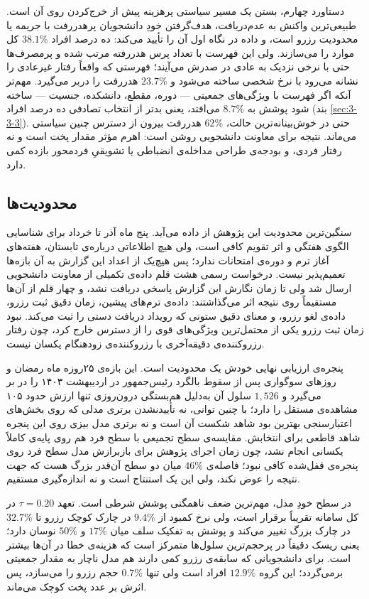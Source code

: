 دستاورد چهارم، بستن یک مسیر سیاستی پرهزینه پیش از خرج‌کردن روی آن است. طبیعی‌ترین
واکنش به عدم‌دریافت، هدف‌گرفتن خودِ دانشجویان پرهدررفت با جریمه یا محدودیت رزرو است، و
داده در نگاه اول آن را تأیید می‌کند: ده درصد افراد $38.1\%$ کل موارد را می‌سازند. ولی
این فهرست با تعداد پرس هدررفته مرتب شده و پرمصرف‌ها حتی با نرخی نزدیک به عادی در صدرش
می‌آیند؛ فهرستی که واقعاً رفتار غیرعادی را نشانه می‌رود با نرخ شخصی ساخته می‌شود و
$23.7\%$ هدررفت را دربر می‌گیرد. مهم‌تر آنکه اگر فهرست با ویژگی‌های جمعیتی — دوره، مقطع،
دانشکده، جنسیت — ساخته شود پوشش به $8.7\%$ می‌افتد، یعنی بدتر از انتخاب تصادفی ده درصد
افراد (بند \ref{sec:3-3-3}). حتی در خوش‌بینانه‌ترین حالت، $62\%$ هدررفت بیرون از دسترس
چنین سیاستی می‌ماند. نتیجه
برای معاونت دانشجویی روشن است: اهرم مؤثر مقدار پخت است و نه رفتار فردی، و بودجه‌ی
طراحی مداخله‌ی انضباطی یا تشویقیِ فردمحور بازده کمی دارد.

\subsection{محدودیت‌ها}
\label{sec:5-2-2}

سنگین‌ترین محدودیت این پژوهش از داده می‌آید. پنج ماه آذر تا خرداد برای شناسایی الگوی
هفتگی و اثر تقویم کافی است، ولی هیچ اطلاعاتی درباره‌ی تابستان، هفته‌های آغاز ترم و
دوره‌ی امتحانات ندارد؛ پس هیچ‌یک از اعداد این گزارش به آن بازه‌ها تعمیم‌پذیر نیست.
درخواست رسمی هشت قلم داده‌ی تکمیلی از معاونت دانشجویی ارسال شد ولی تا زمان نگارش این
گزارش پاسخی دریافت نشد، و چهار قلم از آن‌ها مستقیماً روی نتیجه اثر می‌گذاشتند: داده‌ی ترم‌های
پیشین، زمان دقیق ثبت رزرو، داده‌ی لغو رزرو، و معنای دقیق ستونی که رویداد دریافت دستی را
ثبت می‌کند. نبود زمان ثبت رزرو یکی از محتمل‌ترین ویژگی‌های قوی را از دسترس خارج کرد،
چون رفتار رزروکننده‌ی دقیقه‌آخری با رزروکننده‌ی زودهنگام یکسان نیست.

پنجره‌ی ارزیابی نهایی خودش یک محدودیت است. این بازه‌ی ۲۵روزه ماه رمضان و روزهای
سوگواری پس از سقوط بالگرد رئیس‌جمهور در اردیبهشت ۱۴۰۳ را در بر می‌گیرد و $1{,}526$ سلول
آن به‌دلیل هم‌بستگی درون‌روزی تنها ارزش حدود ۱۰۵ مشاهده‌ی مستقل را دارد؛ با چنین توانی،
نه تأییدنشدن برتری مدلی که روی بخش‌های اعتبارسنجی بهترین بود شاهد شکست آن است و نه
برتری مدل بیزی روی این پنجره شاهد قاطعی برای انتخابش. مقایسه‌ی سطح تجمیعی با سطح فرد هم
روی پایه‌ی کاملاً یکسانی انجام نشد، چون زمان اجرای پژوهش برای بازبرازش مدل سطح فرد روی
پنجره‌ی قفل‌شده کافی نبود؛ فاصله‌ی $46\%$ میان دو سطح آن‌قدر بزرگ هست که جهت نتیجه را
عوض نکند، ولی این یک استنتاج است و نه اندازه‌گیری مستقیم.

در سطح خودِ مدل، مهم‌ترین ضعف ناهمگنی پوشش شرطی است. تعهد $\tau = 0.20$ در کل سامانه
تقریباً برقرار است، ولی نرخ کمبود از $9.4\%$ در چارک کوچک رزرو تا $32.7\%$ در چارک بزرگ
تغییر می‌کند و پوشش به تفکیک سلف میان $17\%$ و $50\%$ نوسان دارد؛ یعنی ریسک دقیقاً در
پرحجم‌ترین سلول‌ها متمرکز است که هزینه‌ی خطا در آن‌ها بیشتر است. برای دانشجویانی که
سابقه‌ی رزرو کمی دارند هم مدل ناچار به مقدار جمعیتی برمی‌گردد؛ این گروه $12.9\%$ افراد
است ولی تنها $0.7\%$ حجم رزرو را می‌سازد، پس اثرش بر عدد پخت کوچک می‌ماند.


